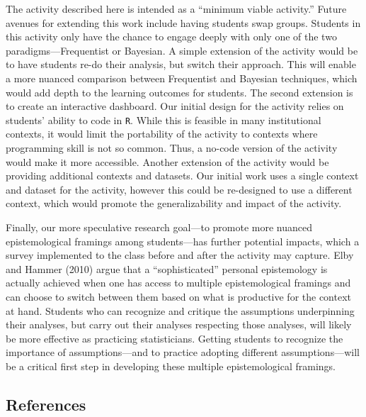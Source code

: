 \documentclass[
  12pt,
  letterpaper,
  DIV=11,
  numbers=noendperiod]{scrartcl}
\begin{document}
The activity described here is intended as a ``minimum viable
activity.'' Future avenues for extending this work include having
students swap groups. Students in this activity only have the chance to
engage deeply with only one of the two paradigms---Frequentist or
Bayesian. A simple extension of the activity would be to have students
re-do their analysis, but switch their approach. This will enable a more
nuanced comparison between Frequentist and Bayesian techniques, which
would add depth to the learning outcomes for students. The second
extension is to create an interactive dashboard. Our initial design for
the activity relies on students' ability to code in \texttt{R}. While
this is feasible in many institutional contexts, it would limit the
portability of the activity to contexts where programming skill is not
so common. Thus, a no-code version of the activity would make it more
accessible. Another extension of the activity would be providing
additional contexts and datasets. Our initial work uses a single context
and dataset for the activity, however this could be re-designed to use a
different context, which would promote the generalizability and impact
of the activity.

Finally, our more speculative research goal---to promote more nuanced
epistemological framings among students---has further potential impacts,
which a survey implemented to the class before and after the activity
may capture. Elby and Hammer (2010) argue that a ``sophisticated''
personal epistemology is actually achieved when one has access to
multiple epistemological framings and can choose to switch between them
based on what is productive for the context at hand. Students who can
recognize and critique the assumptions underpinning their analyses, but
carry out their analyses respecting those analyses, will likely be more
effective as practicing statisticians. Getting students to recognize the
importance of assumptions---and to practice adopting different
assumptions---will be a critical first step in developing these multiple
epistemological framings.

\hypertarget{references}{%
\subsection{References}\label{references}}
\end{document}
